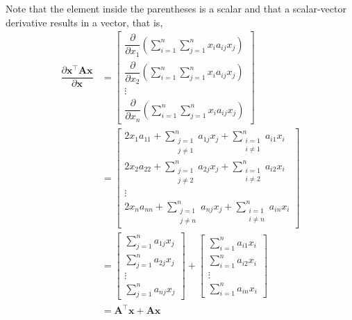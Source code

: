 \documentclass{article}
\newcommand{\trans}{\top}
\begin{document}
Note that the element inside the parentheses is a scalar and that a scalar-vector derivative results in a vector, that is,
\begin{align}
    \dfrac{\partial \mathbf{x}^\trans \mathbf{A} \mathbf{x}}{\partial \mathbf{x}} &= \begin{bmatrix}
        \displaystyle \dfrac{\partial}{\partial x_1} \left( \sum_{i = 1}^{n}\sum_{j = 1}^{n} x_{i} a_{ij} x_{j} \right) \\ 
        \displaystyle  \dfrac{\partial}{\partial x_2} \left( \sum_{i = 1}^{n}\sum_{j = 1}^{n} x_{i} a_{ij} x_{j} \right) \\ 
        \vdots \\ 
        \displaystyle \dfrac{\partial}{\partial x_n} \left( \sum_{i = 1}^{n}\sum_{j = 1}^{n} x_{i} a_{ij} x_{j} \right) 
    \end{bmatrix} \\
    & = \begin{bmatrix}
        \displaystyle 2x_1a_{11} + \sum_{\substack{j = 1 \\ j \neq 1}}^{n} a_{1j} x_{j} + \sum_{\substack{i = 1 \\ i \neq 1}}^{n} a_{i1} x_{i} \\
        \displaystyle 2x_2a_{22} + \sum_{\substack{j = 1 \\ j \neq 2}}^{n} a_{2j} x_{j} + \sum_{\substack{i = 1 \\ i \neq 2}}^{n} a_{i2} x_{i} \\
        \vdots \\
        \displaystyle 2x_na_{nn} + \sum_{\substack{j = 1 \\ j \neq n}}^{n} a_{nj} x_{j} + \sum_{\substack{i = 1 \\ i \neq n}}^{n} a_{in} x_{i} 
    \end{bmatrix} \\
    &= \begin{bmatrix}
        \displaystyle \sum_{j = 1}^{n} a_{1j} x_{j} \\
        \displaystyle \sum_{j = 1}^{n} a_{2j} x_{j} \\
        \vdots \\
        \displaystyle \sum_{j = 1}^{n} a_{nj} x_{j} 
    \end{bmatrix} +
    \begin{bmatrix}
        \displaystyle \sum_{i = 1}^{n} a_{i1} x_{i} \\
        \displaystyle \sum_{i = 1}^{n} a_{i2} x_{i} \\
        \vdots \\
        \displaystyle \sum_{i = 1}^{n} a_{in} x_{i} 
    \end{bmatrix} \\
    & = \mathbf{A}^\trans \mathbf{x} + \mathbf{A} \mathbf{x}
\end{align}
\end{document}
